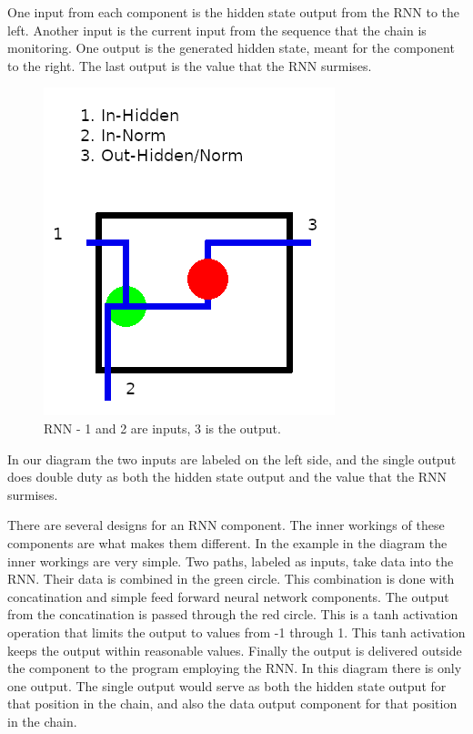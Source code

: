 One input from each component is the hidden state output from the RNN to the left. Another input is the current input from the sequence that the chain is monitoring. One output is the generated hidden state, meant for the component to the right. The last output is the value that the RNN surmises. 

\begin{figure}[H]
	\begin{center}
	
	\includegraphics[scale=0.5]{diagram-rnn}
		
\end{center}
	\caption[Recurrent Neural Network]{RNN - 1 and 2 are inputs, 3 is the output.}
	
\end{figure}

In our diagram the two inputs are labeled on the left side, and the single output does double duty as both the hidden state output and the value that the RNN surmises.

There are several designs for an RNN component. The inner workings of these components are what makes them different. In the example in the diagram the inner workings are very simple. Two paths, labeled as inputs, take data into the RNN. Their data is combined in the green circle. This combination is done with concatination and simple feed forward neural network components. The output from the concatination is passed through the red circle. This is a tanh activation operation that limits the output to values from -1 through 1. This tanh activation keeps the output within reasonable values. Finally the output is delivered outside the component to the program employing the RNN. In this diagram there is only one output. The single output would serve as both the hidden state output for that position in the chain, and also the data output component for that position in the chain.



